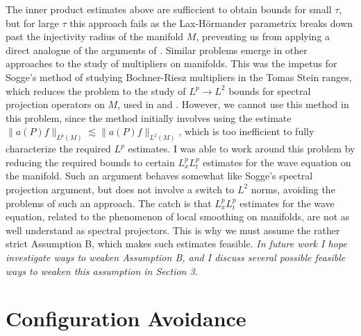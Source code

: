\documentclass[11pt]{article}
\begin{document}
The inner product estimates above are sufficcient to obtain bounds for small $\tau$, but for large $\tau$ this approach fails as the Lax-H\"{o}rmander parametrix breaks down past the injectivity radius of the manifold $M$, preventing us from applying a direct analogue of the arguments of \cite{HeoNazarovSeeger}. Similar problems emerge in other approaches to the study of multipliers on manifolds. This was the impetus for Sogge's method of studying Bochner-Riesz multipliers in the Tomas Stein ranges, which reduces the problem to the study of $L^p \to L^2$ bounds for spectral projection operators on $M$, used in \cite{SoggeRieszMeans} and \cite{KimManifold}. %
However, we cannot use this method in this problem, since the method initially involves using the estimate $\| a(P) f \|_{L^p(M)} \lesssim \| a(P) f \|_{L^2(M)}$, which is too inefficient to fully characterize the required $L^p$ estimates.
I was able to work around this problem by reducing the required bounds to certain $L^p_x L^p_t$ estimates for the wave equation on the manifold. Such an argument behaves somewhat like Sogge's spectral projection argument, but does not involve a switch to $L^2$ norms, avoiding the problems of such an approach. The catch is that $L^p_x L^p_t$ estimates for the wave equation, related to the phenomenon of local smoothing on manifolds, are not as well understand as spectral projectors. This is why we must assume the rather strict Assumption B, which makes such estimates feasible. \emph{In future work I hope investigate ways to weaken Assumption B, and I discuss several possible feasible ways to weaken this assumption in Section 3}.


\section{Configuration Avoidance} \label{Section2}
\end{document}
